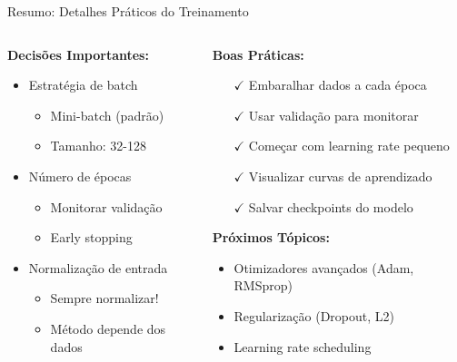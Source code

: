 \documentclass[xcolor=dvipsnames,t,aspectratio=169]{beamer}
\newcommand{\highlight}[1]{{\color{nes_dark_orange} #1}}
\begin{document}
\begin{frame}[c]{Resumo: Detalhes Práticos do Treinamento}
    \begin{columns}[c]
        \begin{column}{0.5\textwidth}
            \textbf{Decisões Importantes:}
            \begin{itemize}
                \item \highlight{Estratégia de batch}
                \begin{itemize}
                    \item Mini-batch (padrão)
                    \item Tamanho: 32-128
                \end{itemize}
                \item \highlight{Número de épocas}
                \begin{itemize}
                    \item Monitorar validação
                    \item Early stopping
                \end{itemize}
                \item \highlight{Normalização de entrada}
                \begin{itemize}
                    \item Sempre normalizar!
                    \item Método depende dos dados
                \end{itemize}
            \end{itemize}
        \end{column}
        \begin{column}{0.5\textwidth}
            \textbf{Boas Práticas:}
            \begin{itemize}
                \item[$\checkmark$] Embaralhar dados a cada época
                \item[$\checkmark$] Usar validação para monitorar
                \item[$\checkmark$] Começar com learning rate pequeno
                \item[$\checkmark$] Visualizar curvas de aprendizado
                \item[$\checkmark$] Salvar checkpoints do modelo
            \end{itemize}
            
            \vspace{0.5cm}
            \textbf{Próximos Tópicos:}
            \begin{itemize}
                \item Otimizadores avançados (Adam, RMSprop)
                \item Regularização (Dropout, L2)
                \item Learning rate scheduling
            \end{itemize}
        \end{column}
    \end{columns}
\end{frame}
\end{document}
